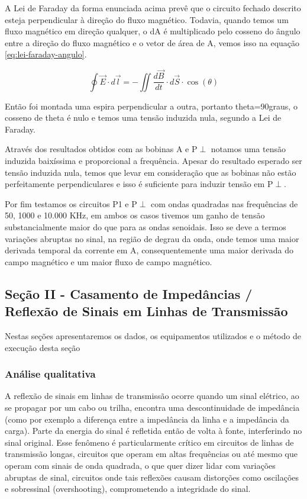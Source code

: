\documentclass[12pt]{article}
\begin{document}
A Lei de Faraday da forma enunciada acima prevê que o circuito
fechado descrito esteja perpendicular à direção do fluxo magnético.
Todavia, quando temos um fluxo magnético em direção qualquer, o dA é
multiplicado pelo cosseno do ângulo entre a direção do fluxo
magnético e o vetor de área de A, vemos isso na equação
\ref{eq:lei-faraday-angulo}.

\begin{equation}
  \label{eq:lei-faraday-angulo}
  \oint \vec{E} \cdot d\vec{l} = -\iint \frac{d\vec{B}}{dt}   \cdot
  d\vec{S} \cdot \cos(\theta)
\end{equation}

Então foi montada uma espira perpendicular a outra, portanto
theta=90graus, o cosseno de theta é nulo e temos uma tensão induzida
nula, segundo a Lei de Faraday.

Através dos resultados obtidos com as bobinas A e P$\perp$ notamos uma
tensão induzida baixíssima e proporcional a frequência. Apesar do
resultado esperado ser tensão induzida nula, temos que levar em
consideração que as bobinas não estão perfeitamente perpendiculares e
isso é suficiente para induzir tensão em P$\perp$.

Por fim testamos os circuitos P1 e P$\perp$ com ondas quadradas nas
frequências de 50, 1000 e 10.000 KHz, em ambos os casos tivemos um
ganho de tensão substancialmente maior do que para as ondas
senoidais. Isso se deve a termos variações abruptas no sinal, na
região de degrau da onda, onde temos uma maior derivada temporal da
corrente em A, consequentemente uma maior derivada do campo magnético
e um maior fluxo de campo magnético.

\subsection{Seção II - Casamento de Impedâncias / Reflexão de Sinais
em Linhas de Transmissão}
Nestas seções apresentaremos os dados, os equipamentos utilizados e o
método de execução desta seção

\subsubsection{Análise qualitativa}

A reflexão de sinais em linhas de transmissão ocorre quando um sinal
elétrico, ao se propagar por um cabo ou trilha, encontra uma
descontinuidade de impedância (como por exemplo a diferença entre a
impedância da linha e a impedância da carga). Parte da energia do
sinal é refletida então de volta à fonte, interferindo no sinal
original. Esse fenômeno é particularmente crítico em circuitos de
linhas de transmissão longas, circuitos que operam em altas
frequências ou até mesmo que operam com sinais de onda quadrada, o
que quer dizer lidar com variações abruptas de sinal, circuitos onde
tais reflexões causam distorções como oscilações e sobressinal
(overshooting), comprometendo a integridade do sinal.
\end{document}
